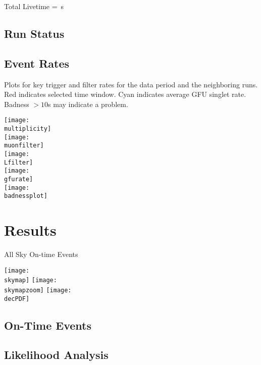 \documentclass[titlepage]{article}
\begin{document}
Total Livetime = \livetime\,s

\centering
\subsection{Run Status}
\runstatustable

\pagebreak
\subsection{Event Rates}
Plots for key trigger and filter rates for the data period
and the neighboring runs.  Red indicates selected time window.
Cyan indicates average GFU singlet rate. Badness $>10$s may indicate
a problem.

\vspace{1em}
{
 \centering        
 \texttt{[image: \\multiplicity]}\\
 \texttt{[image: \\muonfilter]}\\
 \texttt{[image: \\Lfilter]}\\
 \texttt{[image: \\gfurate]}\\
 \texttt{[image: \\badnessplot]}
}
\vspace{2cm}

\pagebreak
%
%
%
%
%
%
%

\section{Results}

{
  \centering
  {\Large All Sky On-time Events}

  \texttt{[image: \\skymap]}
  \vspace{3cm}
  \texttt{[image: \\skymapzoom]}
  \vspace{2cm}
  \texttt{[image: \\decPDF]}

}
\pagebreak

\subsection{On-Time Events}
\event

\subsection{Likelihood Analysis}
\results
\pagebreak

\backgroundpdfplot

\survivialfunctionplot

\vfill        
\end{document}
